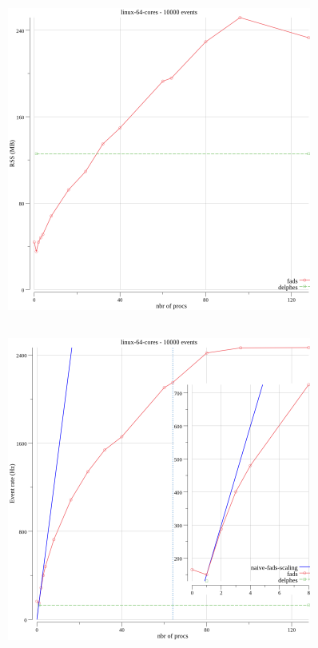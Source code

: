 \documentclass[9pt]{beamer}
\begin{document}
\begin{frame}[fragile]
\frametitle{}


\begin{figure}[h]
\begin{center}
\includegraphics[width=8cm,height=8cm]{_figs/linux-64-cores-rss.png}
\end{center}

\end{figure}


\end{frame}

\begin{frame}[fragile]
\frametitle{}


\begin{figure}[h]
\begin{center}
\includegraphics[width=8cm,height=8cm]{_figs/linux-64-cores-hz.png}
\end{center}

\end{figure}


\end{frame}
\end{document}

